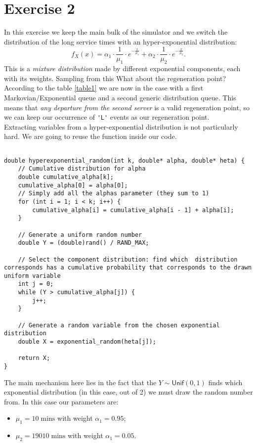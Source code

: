 \documentclass[12pt]{article}
\begin{document}
\section{Exercise 2}
In this exercise we keep the main bulk of the simulator and we switch the distribution of the long service times with an hyper-exponential distribution:
\begin{equation*}
	f_{X}(x) = \alpha_1\cdot\frac{1}{\mu_1}\cdot e^{-\frac{x}{\mu_1}}+\alpha_2\cdot\frac{1}{\mu_2}\cdot e^{-\frac{x}{\mu_2}}.
\end{equation*}
This is a \textit{mixture distribution} made by different exponential components, each with its weights. 
Sampling from this 
What about the regeneration point? According to the table \ref{table1} we are now in the case with a first Markovian/Exponential queue and a second generic distribution queue. This means that \textit{any departure from the second server} is a valid regeneration point, so we can keep our occurrence of \verb*|'L'| events as our regeneration point. \\
Extracting variables from a hyper-exponential distribution is not particularly hard. We are going to reuse the  function inside our code.
\begin{lstlisting}

double hyperexponential_random(int k, double* alpha, double* heta) {
	// Cumulative distribution for alpha
	double cumulative_alpha[k];
	cumulative_alpha[0] = alpha[0];
	// Simply add all the alphas parameter (they sum to 1)
	for (int i = 1; i < k; i++) {
		cumulative_alpha[i] = cumulative_alpha[i - 1] + alpha[i];
	}
	
	// Generate a uniform random number
	double Y = (double)rand() / RAND_MAX;
	
	// Select the component distribution: find which  distribution corresponds has a cumulative probability that corresponds to the drawn uniform variable
	int j = 0;
	while (Y > cumulative_alpha[j]) {
		j++;
	}
	
	// Generate a random variable from the chosen exponential distribution
	double X = exponential_random(heta[j]);
	
	return X;
}

\end{lstlisting}
The main mechanism here lies in the fact that the \rv{} $Y\sim\mathsf{Unif}(0,1)$ finds which exponential distribution (in this case, out of 2) we must draw the random number from. In this case our parameters are:
\begin{itemize}
	\item $\mu_1=10\;\mathrm{mins}$ with weight $\alpha_1=0.95$;
	\item $\mu_2=19010\;\mathrm{mins}$ with weight $\alpha_1=0.05$.
\end{itemize}
\end{document}
